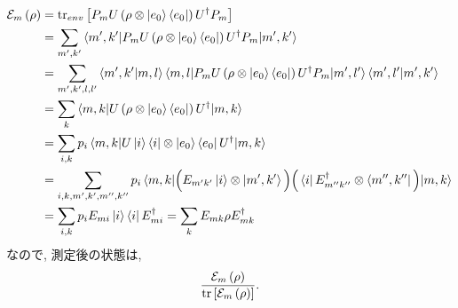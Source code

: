 \begin{ex}
    \label{ex8.9}
    \begin{align*}
        \mathcal{E}_m \left( \rho \right)
         & = \mathrm{tr}_{env} \left[ P_m U \left(\rho \otimes \ket{e_0} \bra{e_0} \right) U^\dagger P_m\right] \\
         & =
        \sum_{m',k'}
        \braket{
            m', k'
            |P_m U \left(\rho \otimes \ket{e_0} \bra{e_0} \right) U^\dagger P_m|
            m', k'
        }
        \\
         & =
        \sum_{m',k',l,l'}
        \braket{m', k'|m,l}
        \braket{
            m,l
            |P_m U \left(\rho \otimes \ket{e_0} \bra{e_0} \right) U^\dagger P_m|
            m', l'
        }
        \braket{m', l'|m',k'}
        \\
         & =
        \sum_{k}
        \braket{
            m,k
            |U \left(\rho \otimes \ket{e_0} \bra{e_0} \right) U^\dagger |
            m, k
        }
        \\
         & =
        \sum_{i,k}
        p_i
        \braket{
            m,k
            |U \ket{i}\bra{i} \otimes \ket{e_0}\bra{e_0} U^\dagger |
            m, k
        }
        \\
         & =
        \sum_{i,k, m', k', m'', k''}
        p_i
        \braket{
            m,k
            |
            \Big( E_{m'k'} \ket{i} \otimes \ket{m',k'} \Big)
            \Big( \bra{i} E_{m''k''}^\dagger \otimes \bra{m'',k''} \Big)
            |
            m, k
        }
        \\
         & =
        \sum_{i,k}
        p_i
        E_{mi} \ket{i}
        \bra{i} E_{mi}^\dagger
        =
        \sum_{k}
        E_{mk} \rho E_{mk}^\dagger
    \end{align*}
    なので, 測定後の状態は,
    \begin{align*}
        \frac{\mathcal{E}_m \left(\rho\right)}
        {\mathrm{tr}\left[ \mathcal{E}_m\left(\rho\right)\right]}.
    \end{align*}
\end{ex}

